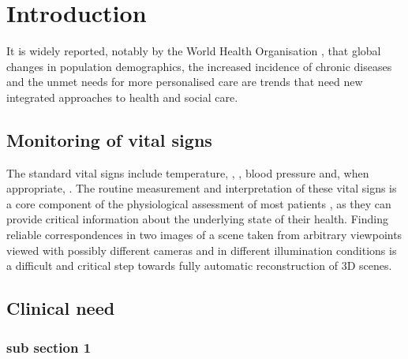 \chapter{Introduction}
\label{chapter:introduction}

It is widely reported, notably by the World Health Organisation \cite{stroetmann2010can}, that global changes in population demographics, the increased incidence of chronic diseases and the unmet needs for more personalised care are trends that need new integrated approaches to health and social care.

\lipsum[1-2]\cite{brooks1984infrared}

\lipsum[3-4]\cite{barker1987pulse,peacock1998oxygen,moller1993randomized}

\section{Monitoring of vital signs}

The standard vital signs include temperature, , , blood pressure and, when appropriate, . The routine measurement and interpretation of these vital signs is a core component of the physiological assessment of most patients \cite{prior1977physical,goldberg2005practical}, as they can provide critical information about the underlying state of their health. Finding reliable correspondences in two images of a scene taken from arbitrary viewpoints viewed with possibly different cameras and in different illumination conditions is a difficult and critical step towards fully automatic reconstruction of 3D scenes\cite{hartley2003multiple}.

\lipsum[7-11]\cite{priya2012transition,haralick1973textural,Grass2012Online,NoninPulseOxOnline}

\section{Clinical need}

\lipsum[1-2]\cite{HidalgoEquivitalEQ02Online,poh2011advancements,poh2010non,verkruysse2008remote,wieringa2005contactless,wiki:bayerfilter,nonin9560oem,Mas_Fernandez_2003,hartley2003multiple}

\subsection{sub section 1}

\lipsum[3-6]\cite{schmidt1997animal,4036907,Orbanz2008,varjavand2002interactive,report:PCESC2005,HSU_05_2012,collins2015relating,abdi2010principal}


